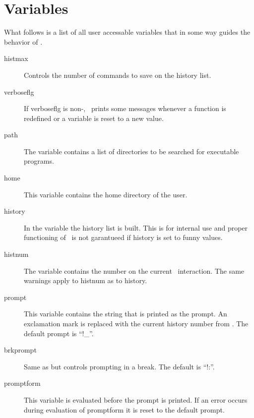 %
%
%
%
%
\section{Variables}
What follows is a list of all user accessable variables that in some
way guides the behavior of \lips.
\begin{description}
\item[histmax] Controls the number of commands to save on the history
  list.
\item[verboseflg] If verboseflg is non-\NIL, \lips\ prints some
  messages whenever a function is redefined or a variable is reset to
  a new value.
\item[path] The  variable contains a list of directories to
  be searched for executable programs.
\item[home] This variable contains the home directory of the user.
\item[history] In the  variable the history list is
  built.  This is for internal use and proper functioning of \lips\ is
  not garantueed if history is set to funny values.
\item[histnum] The variable  contains the number on the
  current \lips\ interaction.  The same warnings apply to histnum as
  to history.
\item[prompt] This variable contains the string that is printed as the
  prompt.  An exclamation mark is replaced with the current history
  number from .  The default prompt is ``!\_''.
\item[brkprompt] Same as  but controls prompting in a break.
  The default is ``!:''.
\item[promptform] This variable is evaluated before the prompt is
  printed.  If an error occurs during evaluation of promptform it is
  reset to the default prompt.
\end{description}
